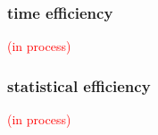 \subsubsection{time efficiency}
%
\textcolor{red}{(in process)}

\begin{comment}
	time needed for each judgement based on method from (Coertjens_et_al_2017).
	
	statistical efficiency has been researched on \citet{Leijon_et_al_2019} and \citet{Pritikin_2020} for the bayesian dichotomous BTL model and the ordinal BTL model, respectively.
\end{comment}
%
%
\subsubsection{statistical efficiency}
%
\textcolor{red}{(in process)}
